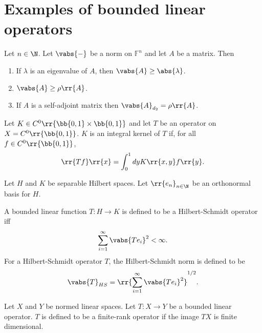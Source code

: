 \documentclass{article}
\begin{document}
\section{Examples of bounded linear operators}

\begin{theorem}
  Let $n\in\N$. Let $\vabs{-}$ be a norm on $\mathbb F^n$ and let $A$ be a matrix. Then
  \begin{enumerate}
    \item If $\lambda$ is an eigenvalue of $A$, then $\vabs{A}\geq \abs{\lambda}$.
    \item $\vabs{A}\geq \rho\rr{A}$.
    \item If $A$ is a self-adjoint matrix then $\vabs{A}_{d_2}=\rho\rr{A}$.
  \end{enumerate}
\end{theorem}

\begin{definition}
  Let $K\in C^0\rr{\bb{0,1}\times \bb{0,1}}$ and let $T$ be an operator on $X=C^0\rr{\bb{0,1}}$.
  $K$ is an integral kernel of $T$ if, for all $f\in C^0\rr{\bb{0,1}}$,
  \begin{align*}
    \rr{Tf}\rr{x}=\int_0^1 dy K\rr{x,y}f\rr{y}.
  \end{align*}
\end{definition}

\begin{definition}
  Let $H$ and $K$ be separable Hilbert spaces. Let $\rr{e_n}_{n\in\N}$ be an orthonormal
  basis for $H$.

  A bounded linear function $T:H\to K$ is defined to be a Hilbert-Schmidt operator iff
  \begin{align*}
    \sum_{i=1}^{\infty} \vabs{Te_i}^2<\infty.
  \end{align*}
  For a Hilbert-Schmidt operator $T$, the Hilbert-Schmidt norm is defined to be
  \begin{align*}
    \vabs{T}_{HS}=\rr{\sum_{i=1}^{\infty} \vabs{Te_i}^2}^{1/2}.
  \end{align*}
\end{definition}

\begin{definition}
  Let $X$ and $Y$ be normed linear spaces. Let $T:X\to Y$ be a bounded linear operator. $T$
  is defined to be a finite-rank operator if the image $TX$ is finite dimensional.
\end{definition}
\end{document}
